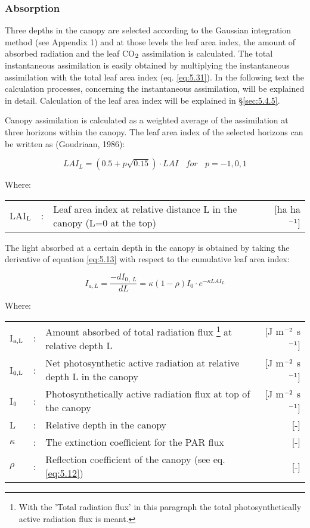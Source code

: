 \subsubsection{Absorption}
Three depths in the canopy are selected according to the Gaussian integration method (see
Appendix 1) and at those levels the leaf area index, the amount of absorbed radiation and
the leaf CO$_{{\rm 2}}$ assimilation is calculated. The total instantaneous assimilation is easily
obtained by multiplying the instantaneous assimilation with the total leaf area index (eq.
\ref{eq:5.31}). In the following text the calculation processes, concerning the instantaneous
assimilation, will be explained in detail. Calculation of the leaf area index will be
explained in \S \ref{sec:5.4.5}.

Canopy assimilation is calculated as a weighted average of the assimilation at three
horizons within the canopy. The leaf area index of the selected horizons can be written as
(Goudriaan, 1986):

\begin{equation}
LAI_{L} = (0.5 + p \sqrt{0.15}) \cdot LAI~~~~for~~~~p = -1,0,1
\end{equation}


Where:\\[5pt]
\begin{tabularx}{\textwidth}{llXr}
	LAI$_{{\rm L}}$ &:& Leaf area index at relative distance L in the canopy 
	(L=0 at the top)    &    [ha ha$^{{\rm -1}}$]\\
\end{tabularx}

The light absorbed at a certain depth in the canopy is obtained by taking the derivative of
equation \ref{eq:5.13} with respect to the cumulative leaf area index:

\begin{equation}
I_{a,L} = {\frac{-dI _{0\, ,\, L} }{dL}} = \kappa (1 -  \rho) I_{0} \cdot e^{- \kappa LAI_{L}}
\end{equation}

Where:\\[5pt]
\begin{tabularx}{\textwidth}{llXr}
	I$_{{\rm a,L}}$ &:& Amount absorbed of total radiation flux
	\footnote{With the 'Total radiation flux' in this paragraph the total photosynthetically 
		active radiation flux is meant.} at relative depth L    &    
	[J m$^{{\rm -2}}$ s$^{{\rm -1}}$]\\
	I$_{{\rm 0,L}}$ &:& Net photosynthetic active radiation at relative depth L in 
	the canopy    &    [J m$^{{\rm -2}}$ s$^{{\rm -1}}$]\\
	I$_{{\rm 0}}$ &:& Photosynthetically active radiation flux at top of the 
	canopy   &     [J m$^{{\rm -2}}$ s$^{{\rm -1}}$]\\
	L &:& Relative depth in the canopy   &     [-]\\
	$\kappa$ &:& The extinction coefficient for the PAR flux    &     [-]\\
	$\rho$ &:& Reflection coefficient of the canopy (see eq. \ref{eq:5.12})   &     [-]\\
\end{tabularx}

